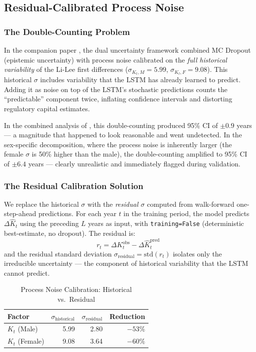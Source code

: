 \documentclass[11pt,a4paper]{article}
\begin{document}
\subsection{Residual-Calibrated Process Noise}\label{sec:residual_sigma}

\subsubsection{The Double-Counting Problem}

In the companion paper \cite{rindori2026p04}, the dual uncertainty framework combined MC Dropout (epistemic uncertainty) with process noise calibrated on the \textit{full historical variability} of the Li-Lee first differences ($\sigma_{K_t,M} = 5.99$, $\sigma_{K_t,F} = 9.08$). This historical $\sigma$ includes variability that the LSTM has already learned to predict. Adding it as noise on top of the LSTM's stochastic predictions counts the ``predictable'' component twice, inflating confidence intervals and distorting regulatory capital estimates.

In the combined analysis of \cite{rindori2026p04}, this double-counting produced 95\% CI of $\pm 0.9$ years --- a magnitude that happened to look reasonable and went undetected. In the sex-specific decomposition, where the process noise is inherently larger (the female $\sigma$ is 50\% higher than the male), the double-counting amplified to 95\% CI of $\pm 6.4$ years --- clearly unrealistic and immediately flagged during validation.

\subsubsection{The Residual Calibration Solution}

We replace the historical $\sigma$ with the \textit{residual $\sigma$} computed from walk-forward one-step-ahead predictions. For each year $t$ in the training period, the model predicts $\Delta \hat{K}_t$ using the preceding $L$ years as input, with \texttt{training=False} (deterministic best-estimate, no dropout). The residual is:
\begin{equation}
    r_t = \Delta K_t^{\text{obs}} - \Delta \hat{K}_t^{\text{pred}}
\end{equation}
and the residual standard deviation $\sigma_{\text{residual}} = \text{std}(r_t)$ isolates only the irreducible uncertainty --- the component of historical variability that the LSTM cannot predict.

\begin{table}[H]
\centering
\caption{Process Noise Calibration: Historical vs.\ Residual}
\label{tab:sigma}
\begin{tabular}{@{}lrrr@{}}
\toprule
Factor & $\sigma_{\text{historical}}$ & $\sigma_{\text{residual}}$ & Reduction \\ \midrule
$K_t$ (Male) & 5.99 & 2.80 & $-53\%$ \\
$K_t$ (Female) & 9.08 & 3.64 & $-60\%$ \\
\bottomrule
\end{tabular}
\end{table}
\end{document}

